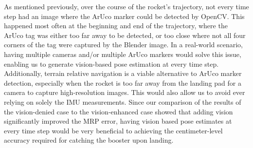 \documentclass[conference]{IEEEtran}
\begin{document}
As mentioned previously, over the course of the rocket's trajectory, not every time step had an image where the ArUco marker could be detected by OpenCV.
This happened most often at the beginning and end of the trajectory, where the ArUco tag was either too far away to be detected, or too close where not all four corners of the tag were captured by the Blender image. 
In a real-world scenario, having multiple cameras and/or multiple ArUco markers would solve this issue, enabling us to generate vision-based pose estimation at every time step.
Additionally, terrain relative navigation is a viable alternative to ArUco marker detection, especially when the rocket is too far away from the landing pad for a camera to capture high-resolution images. 
This would also allow us to avoid ever relying on solely the IMU measurements. 
Since our comparison of the results of the vision-denied case to the vision-enhanced case showed that adding vision significantly improved the MRP error, having vision based pose estimates at every time step would be very beneficial to achieving the centimeter-level accuracy required for catching the booster upon landing.







\end{document}
